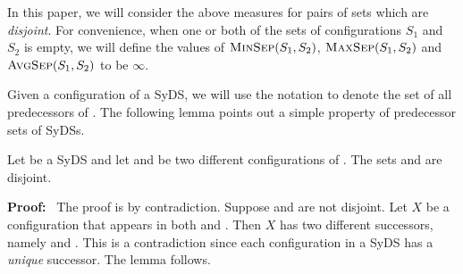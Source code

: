\smallskip

In this paper, we will consider the above measures for pairs of sets
which are \emph{disjoint}.
For convenience, when one or both of the sets of configurations
$S_1$ and $S_2$ is empty, we will define the values of 
$\mbox{\textsc{MinSep}}(S_1, S_2)$,
$\mbox{\textsc{MaxSep}}(S_1, S_2)$ and $\mbox{\textsc{AvgSep}}(S_1, S_2)$ to be $\infty$.


\smallskip

Given a configuration \calc{} of a SyDS, we will use the notation \predset{\calc}{}
to denote the set of all predecessors of \calc.
The following lemma points out a simple property of predecessor sets
of SyDSs.

\begin{lemma}\label{lem:disjoint_pred}
Let \cals{} be a SyDS and let \calcone{} and \calctwo{} be two different
configurations of \cals.
The sets \predset{\calcone}{} and \predset{\calctwo}{} are disjoint.
\end{lemma}

\noindent
\textbf{Proof:}~ The proof is by contradiction.
Suppose \predset{\calcone}{} and \predset{\calctwo}{} are not disjoint.
Let $X$ be a configuration that appears in both
\predset{\calcone}{} and \predset{\calctwo}.
Then $X$ has two different successors, namely \calcone{} and \calctwo.
This is a contradiction since each configuration in a SyDS has a \emph{unique}
successor. The lemma follows. \QED

